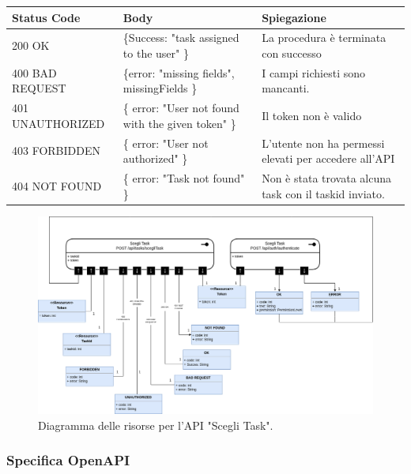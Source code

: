 \documentclass{report}
\begin{document}
\begin{center} %
	\centering
	\begin{tabular}{ |p{4cm}|p{4cm}|p{4cm}| }
		\hline
		\centering Status Code & \qquad\qquad\quad Body                             & \qquad\quad Spiegazione                                \\ %
		\hline
		200 OK                 & \{Success: "task assigned to the user" \}          & La procedura è terminata con successo                  \\
		\hline
		400 BAD REQUEST        & \{error: "missing fields", missingFields \}        & I campi richiesti sono mancanti.                       \\
		\hline
		401 UNAUTHORIZED       & \{ error: "User not found with the given token" \} & Il token non è valido                                  \\
		\hline
		403 FORBIDDEN          & \{ error: "User not authorized" \}                 & L'utente non ha permessi elevati per accedere all'API  \\
		\hline
		404 NOT FOUND          & \{ error: "Task not found" \}                      & Non è stata trovata alcuna task con il taskid inviato. \\
		\hline
	\end{tabular}
\end{center}


\begin{figure}[H]
	\centering\includegraphics[width=1\textwidth]{images/scegli_task_model.png}
	Diagramma delle risorse per l'API "Scegli Task".
\end{figure}

\subsubsection*{Specifica OpenAPI}
\end{document}
